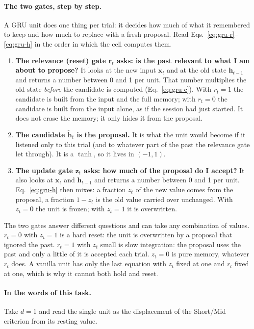 \documentclass[11pt,a4paper]{article}
\newcommand{\vect}[1]{\bm{#1}}
\begin{document}
\paragraph{The two gates, step by step.} A GRU unit does one thing per trial: it
decides how much of what it remembered to keep and how much to replace with a fresh
proposal. Read Eqs.~\eqref{eq:gru-r}--\eqref{eq:gru-h} in the order in which the cell
computes them.

\begin{enumerate}[leftmargin=*]
\item \textbf{The relevance (reset) gate $\vect{r}_t$ asks: is the past relevant to what
      I am about to propose?} It looks at the new input $\vect{x}_t$ and at the old
      state $\vect{h}_{t-1}$ and returns a number between 0 and 1 per unit. That number
      multiplies the old state \emph{before} the candidate is computed
      (Eq.~\eqref{eq:gru-c}). With $r_t = 1$ the candidate is built from the input and
      the full memory; with $r_t = 0$ the candidate is built from the input alone, as if
      the session had just started. It does not erase the memory; it only hides it from
      the proposal.
\item \textbf{The candidate $\tilde{\vect{h}}_t$ is the proposal.} It is what the unit
      would become if it listened only to this trial (and to whatever part of the past
      the relevance gate let through). It is a $\tanh$, so it lives in $(-1, 1)$.
\item \textbf{The update gate $\vect{z}_t$ asks: how much of the proposal do I accept?}
      It also looks at $\vect{x}_t$ and $\vect{h}_{t-1}$ and returns a number between 0
      and 1 per unit. Eq.~\eqref{eq:gru-h} then mixes: a fraction $z_t$ of the new value
      comes from the proposal, a fraction $1 - z_t$ is the old value carried over
      unchanged. With $z_t = 0$ the unit is frozen; with $z_t = 1$ it is overwritten.
\end{enumerate}

The two gates answer different questions and can take any combination of values.
$r_t = 0$ with $z_t = 1$ is a hard reset: the unit is overwritten by a proposal that
ignored the past. $r_t = 1$ with $z_t$ small is slow integration: the proposal uses the
past and only a little of it is accepted each trial. $z_t = 0$ is pure memory,
whatever $r_t$ does. A vanilla unit has only the last equation with $z_t$ fixed at one
and $r_t$ fixed at one, which is why it cannot both hold and reset.

\paragraph{In the words of this task.} Take $d = 1$ and read the single unit as the
displacement of the Short/Mid criterion from its resting value.
\end{document}
